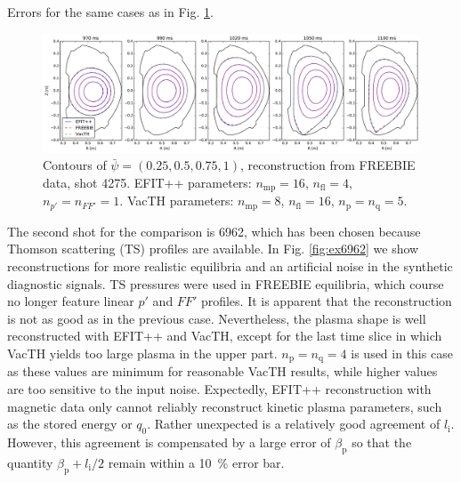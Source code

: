 \begin{table}
\caption{Errors for the same cases as in Fig. \ref{fig:ex4275}.}
\label{table:ex4275}
\end{table}

\begin{figure}
\centering   %
\hfill{}
\includegraphics[width=18cm]{figures/example_4275.pdf}
\hfill{}
\caption{Contours of $\bar\psi=\left(0.25,0.5,0.75,1\right)$, reconstruction from FREEBIE data, shot 4275. EFIT++ parameters: $n_\mathrm{mp} = 16$, $n_\mathrm{fl} = 4$, $n_{p'} = n_{FF'} = 1$. VacTH parameters: $n_\mathrm{mp} = 8$, $n_\mathrm{fl} = 16$, $n_{\mathrm p} = n_{\mathrm q} = 5$.}
\label{fig:ex4275}
\end{figure}


The second shot for the comparison is 6962, which has been chosen because Thomson scattering (TS) profiles are available. In Fig. \ref{fig:ex6962} we show reconstructions for more realistic equilibria and an artificial noise in the synthetic diagnostic signals. TS pressures were used in FREEBIE equilibria, which course no longer feature linear $p'$ and $FF'$ profiles. 
It is apparent that the reconstruction is not as good as in the previous case. Nevertheless, the plasma shape is well reconstructed with EFIT++ and VacTH, except for the last time slice in which VacTH yields too large plasma in the upper part.
$n_{\mathrm p} = n_{\mathrm q} = 4$ is used in this case as these values are minimum for reasonable VacTH results, while higher values are too sensitive to the input noise.
Expectedly, EFIT++ reconstruction with magnetic data only cannot reliably reconstruct kinetic plasma parameters, such as the stored energy or $q_0$. Rather unexpected is a relatively good agreement of $l_\mathrm{i}$. However, this agreement is compensated by a large error of $\beta_{\mathrm p}$ so that the quantity $\beta_{\mathrm p} + l_{\mathrm i}/2$ remain within a 10~\% error bar.


